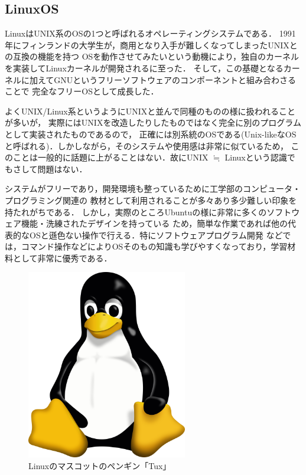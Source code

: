 \documentclass[autodetect-engine,dvi=dvipdfmx,ja=standard,a4j]{bxjsarticle}
\begin{document}
\subsection{LinuxOS}
LinuxはUNIX系のOSの1つと呼ばれるオペレーティングシステムである．
1991年にフィンランドの大学生が，商用となり入手が難しくなってしまったUNIXとの互換の機能を持つ
OSを動作させてみたいという動機により，独自のカーネルを実装してLinuxカーネルが開発されるに至った．
そして，この基礎となるカーネルに加えてGNUというフリーソフトウェアのコンポーネントと組み合わさることで
完全なフリーOSとして成長した．

よくUNIX/Linux系というようにUNIXと並んで同種のものの様に扱われることが多いが，
実際にはUNIXを改造したりしたものではなく完全に別のプログラムとして実装されたものであるので，
正確には別系統のOSである(Unix-likeなOSと呼ばれる)．しかしながら，そのシステムや使用感は非常に似ているため，
このことは一般的に話題に上がることはない．故にUNIX $\fallingdotseq$ Linuxという認識でもさして問題はない．

システムがフリーであり，開発環境も整っているために工学部のコンピュータ・プログラミング関連の
教材として利用されることが多々あり多少難しい印象を持たれがちである．
しかし，実際のところUbuntuの様に非常に多くのソフトウェア機能・洗練されたデザインを持っている
ため，簡単な作業であれば他の代表的なOSと遜色ない操作で行える．特にソフトウェアプログラム開発
などでは，コマンド操作などによりOSそのもの知識も学びやすくなっており，学習材料として非常に優秀である．

\begin{figure}[H]
    \centering
    \includegraphics[width=70mm]{image/Tux.svg.png}
    \caption*{Linuxのマスコットのペンギン「Tux」}
    \label{fig:Tux}
\end{figure}
\end{document}

